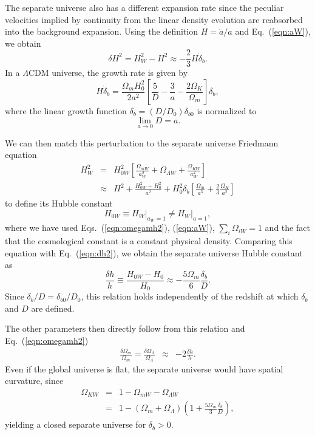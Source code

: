 \documentclass[prd,twocolumn,amsmath,amssymb,floatfix,superscriptaddress]{revtex4-1}
\begin{document}
The separate universe also has a different expansion rate since the peculiar velocities implied
by continuity from the linear density evolution are reabsorbed into the background expansion.
Using the definition $H = \dot a/a$ and Eq.~(\ref{eqn:aW}), we obtain
\begin{equation}
\delta H^2 = H_W^2 - H^2 \approx -{\frac{2}{3} }H \dot \delta_b .
\label{eqn:dh2}
\end{equation}
%
In a $\Lambda$CDM universe, the growth rate is given by
%
\begin{equation}
H \dot \delta_b = \frac{\Omega_m H_0^2}{2 a^2} \left[ \frac{5}{D} -\frac{3}{a} - \frac{2 \Omega_K}{\Omega_m} \right] \delta_b,
\label{eqn:ddeltab}
\end{equation}
%
where the linear growth function $\delta_b = (D/D_0)\delta_{b0}$ is
normalized to 
%
\begin{equation}
\lim_{a\rightarrow 0} D = a.
\end{equation}
%

We can then match this perturbation to the separate universe Friedmann equation
\begin{eqnarray}
H_W^2 &=& H_{0W}^2 \left[ \frac{\Omega_{mW}}{a_W^3} + \Omega_{\Lambda W} 
+ \frac{\Omega_{KW}}{a_W^2} \right] \\
&\approx& H^2 + \frac{H_{0W}^2-H_0^2}{a^{2}} +H_0^2\delta_b\left[
\frac{\Omega_m}{a^{3}}+\frac{2}{3}\frac{\Omega_K}{a^{2}}\right] \nonumber
\end{eqnarray}
 to
define its Hubble constant 
\begin{equation}
H_{0W}\equiv H_W\big|_{a_W=1} \ne H_W \big|_{a=1},
\end{equation}
where we have used  Eqs.~(\ref{eqn:omegamh2}), (\ref{eqn:aW}), $\sum_i \Omega_{iW}=1$ and the fact that
 the cosmological constant is a constant physical density.
Comparing this equation with Eq.~(\ref{eqn:dh2}), we obtain  the separate universe  Hubble
constant as \cite{Sirko:05}
\begin{equation}
 \frac{\delta h}{h}  \equiv \frac{ H_{0W} - H_0}{H_0} \approx -\frac{5\Omega_m}{6}\frac{\delta_b}{D}.
 \label{eqn:hpert}
\end{equation}
Since $\delta_b/D= {\delta_{b0}/D_0}$, this relation holds independently of the redshift at which $\delta_b$ and $D$ are
defined.  

The other parameters then directly follow from this relation and
Eq.~(\ref{eqn:omegamh2})
%
\begin{eqnarray}
\frac{\delta \Omega_m}{\Omega_m}
=\frac{\delta \Omega_\Lambda}{\Omega_\Lambda}
 &\approx& 
{- 2 \frac{\delta h}{h}.}
%
\end{eqnarray}
Even if the global universe is flat, the separate universe would have
spatial curvature, since
\begin{eqnarray}
\Omega_{KW}&=& 1-\Omega_{mW}-\Omega_{\Lambda W} \nonumber\\
&=& 1-(\Omega_{m}+\Omega_{\Lambda})\left(1+\frac{5\Omega_m}{3}\frac{\delta_b}{D}\right),
\end{eqnarray}
yielding a closed separate universe for $\delta_b>0$.  
\end{document}
